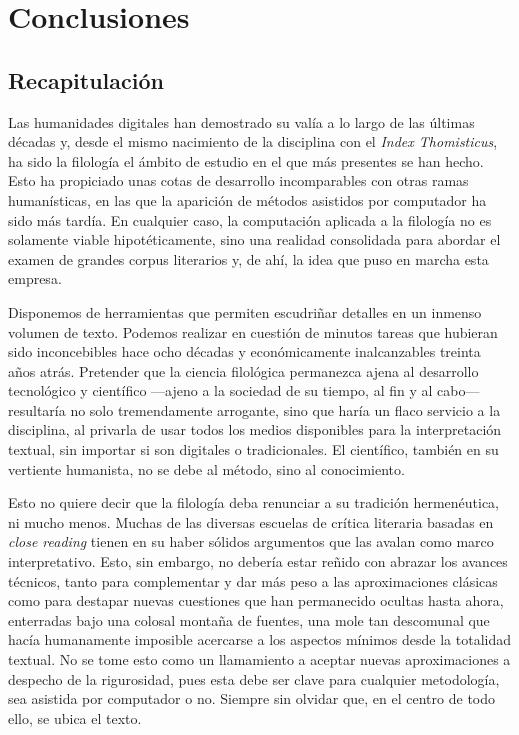 \chapter{Conclusiones}

\section{Recapitulación}
Las humanidades digitales han demostrado su valía a lo largo de las últimas décadas y, desde el mismo nacimiento de la disciplina con el \textit{Index Thomisticus}, ha sido la filología el ámbito de estudio en el que más presentes se han hecho. Esto ha propiciado unas cotas de desarrollo incomparables con otras ramas humanísticas, en las que la aparición de métodos asistidos por computador ha sido más tardía. En cualquier caso, la computación aplicada a la filología no es solamente viable hipotéticamente, sino una realidad consolidada para abordar el examen de  grandes corpus literarios y, de ahí, la idea que puso en marcha esta empresa.

Disponemos de herramientas que permiten escudriñar detalles en un inmenso volumen de texto. Podemos realizar en cuestión de minutos tareas que hubieran sido inconcebibles hace ocho décadas y económicamente inalcanzables treinta años atrás. Pretender que la ciencia filológica permanezca ajena al desarrollo tecnológico y científico —ajeno a la sociedad de su tiempo, al fin y al cabo— resultaría no solo tremendamente arrogante, sino que haría un flaco servicio a la disciplina, al privarla de usar todos los medios disponibles para la interpretación textual, sin importar si son digitales o tradicionales. El científico, también en su vertiente humanista, no se debe al método, sino al conocimiento.  

Esto no quiere decir que la filología deba renunciar a su tradición hermenéutica, ni mucho menos. Muchas de las diversas escuelas de crítica literaria basadas en \textit{close reading} tienen en su haber sólidos argumentos que las avalan como marco interpretativo. Esto, sin embargo, no debería estar reñido con abrazar los avances técnicos, tanto para complementar y dar más peso a las aproximaciones clásicas como para destapar nuevas cuestiones que han permanecido ocultas hasta ahora, enterradas bajo una colosal montaña de fuentes, una mole tan descomunal que hacía humanamente imposible acercarse a los aspectos mínimos desde la totalidad textual. No se tome esto como un llamamiento a aceptar nuevas aproximaciones a despecho de la rigurosidad, pues esta debe ser clave para cualquier metodología, sea asistida por computador o no. Siempre sin olvidar que, en el centro de todo ello, se ubica el texto.

